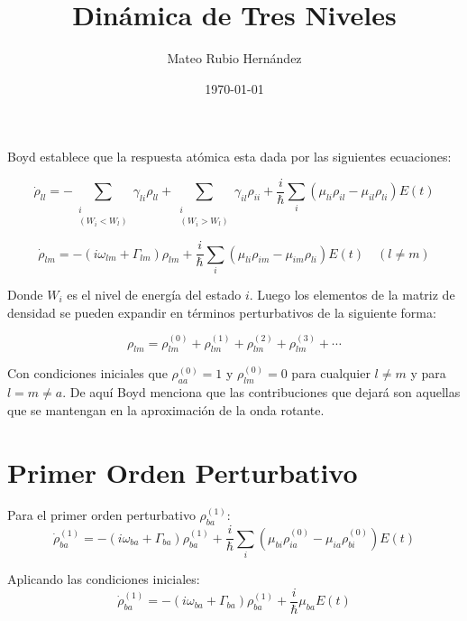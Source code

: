 \documentclass[12pt,a4paper]{article}
\title{Dinámica de Tres Niveles}
\author{Mateo Rubio Hernández}
\date{\today}
\begin{document}
\maketitle

Boyd establece que la respuesta atómica esta dada por las siguientes ecuaciones:

\begin{equation}
\dot{\rho}_{ll} = -\sum_{\substack{i \\ (W_i < W_l)}} \gamma_{li}\rho_{ll} + \sum_{\substack{i \\ (W_i > W_l)}} \gamma_{il}\rho_{ii} + \frac{i}{\hbar} \sum_{i} (\mu_{li}\rho_{il} - \mu_{il}\rho_{li})E(t) 
\end{equation}

\begin{equation}
\dot{\rho}_{lm} = -(i\omega_{lm} + \Gamma_{lm})\rho_{lm} + \frac{i}{\hbar} \sum_{i} (\mu_{li}\rho_{im} - \mu_{im}\rho_{li})E(t) \quad (l \neq m) 
\end{equation}

Donde $W_i$ es el nivel de energía del estado $i$. Luego los elementos de la matriz de densidad se pueden expandir en términos perturbativos de la siguiente forma:

\begin{equation}
\rho_{lm} = \rho_{lm}^{(0)} + \rho_{lm}^{(1)} + \rho_{lm}^{(2)} + \rho_{lm}^{(3)} + \cdots 
\end{equation}

Con condiciones iniciales que $\rho_{aa}^{(0)} = 1$ y $\rho_{lm}^{(0)} = 0$ para cualquier $l \neq m$ y para $l = m \neq a$. De aquí Boyd menciona que las contribuciones que dejará son aquellas que se mantengan en la aproximación de la onda rotante.

\section{Primer Orden Perturbativo}
Para el primer orden perturbativo $\rho_{ba}^{(1)}$:
\begin{equation}
\dot{\rho}_{ba}^{(1)} = -(i\omega_{ba} + \Gamma_{ba})\rho_{ba}^{(1)} + \frac{i}{\hbar} \sum_{i} (\mu_{bi}\rho_{ia}^{(0)} - \mu_{ia}\rho_{bi}^{(0)})E(t)
\end{equation}

Aplicando las condiciones iniciales:
\begin{equation}
\dot{\rho}_{ba}^{(1)} = -(i\omega_{ba} + \Gamma_{ba})\rho_{ba}^{(1)} + \frac{i}{\hbar} \mu_{ba} E(t)
\end{equation}
\end{document}
